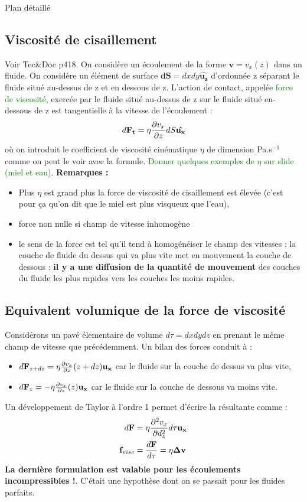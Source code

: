 \begin{reportBlock}{Plan détaillé}
\subsection{Viscosité de cisaillement}
Voir Tec\&Doc p418. On considère un écoulement de la forme $\mathbf{v}=v_x(z)$ dans un fluide. On considère un élément de surface $\mathbf{dS}=dxdy\mathbf{\hat{u_z}}$ d'ordonnée z séparant le fluide situé au-dessus de z et en dessous de z. L'action de contact, appelée \textcolor{green}{force de viscosité}, exercée par le fluide situé au-dessus de z sur le fluide situé en-dessous de z est tangentielle à la vitesse de l'écoulement :
\begin{equation}
    d\mathbf{F_t} = \eta\frac{\partial v_x}{\partial z}dS\mathbf{\hat{u_x}}
\end{equation}
où on introduit le coefficient de viscosité cinématique $\eta$ de dimension Pa.s$^{-1}$ comme on peut le voir avec la formule. \textcolor{green}{Donner quelques exemples de $\eta$ sur slide (miel et eau)}. 
\textbf{Remarques :}
\begin{itemize}
    \item Plus $\eta$ est grand plus la force de viscosité de cisaillement est élevée (c'est pour ça qu'on dit que le miel est plus visqueux que l'eau),
    \item force non nulle si champ de vitesse inhomogène
    \item le sens de la force est tel qu'il tend à homogénéiser le champ des vitesses : la couche de fluide du dessus qui va plus vite met en mouvement la couche de dessous : \textbf{il y a une diffusion de la quantité de mouvement} des couches du fluide les plus rapides vers les couches les moins rapides.
\end{itemize} 

  \subsection{Equivalent volumique de la force de viscosité}
Considérons un pavé élementaire de volume $d\tau=dxdydz$ en prenant le même champ de vitesse que précédemment. Un bilan des forces conduit à :
\begin{itemize}
    \item $d\mathbf{F}_{z+dz}=\eta\frac{\partial v_x}{\partial z}(z+dz)\mathbf{u_x}$ car le fluide sur la couche de dessus va plus vite,
    \item  $d\mathbf{F}_{z}=-\eta\frac{\partial v_x}{\partial z}(z)\mathbf{u_x}$ car le fluide sur la couche de dessous va moins vite.
\end{itemize}
Un développement de Taylor à l'ordre 1 permet d'écrire la résultante comme :
\begin{align}
    d\mathbf{F} &= \eta\frac{\partial ^2v_x}{\partial d_z^2}d\tau\mathbf{u_x} \\
    \mathbf{f}_{visc}&=\frac{d\mathbf{F}}{d\tau} = \eta\mathbf{\Delta v}
\end{align}
\textbf{La dernière formulation est valable pour les écoulements incompressibles !}. C'était une hypothèse dont on se passait pour les fluides parfaits.



\end{reportBlock}
